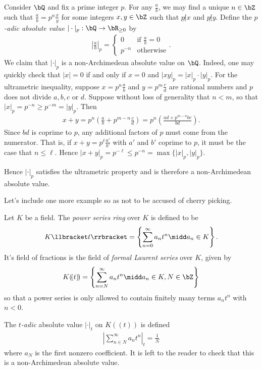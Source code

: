 \begin{example}\label{example}
	Consider $\bQ$ and fix a prime integer $p$. For any $\frac{a}{b}$, we may find a unique $n \in \bZ$ such that $\frac{a}{b} = p^n\frac{x}{y}$ for some integers $x,y\in \bZ$ such that $p \not| x$ and $p \not| y$. Define the \emph{$p$-adic absolute value} $|\cdot|_p:\bQ\to \bR_{\geq 0}$ by
	\begin{align*}
		\left|\frac{a}{b}\right|_p = 
		\begin{cases}
			0 & \text{if } \frac{a}{b} = 0 \\
			p^{-n} & \text{otherwise}
		\end{cases}.
	\end{align*}
	We claim that $|\cdot|_p$ is a non-Archimedean absolute value on $\bQ$. Indeed, one may quickly check that $|x| = 0$ if and only if $x = 0$ and $|xy|_p = |x|_p\cdot|y|_p$. For the ultrametric inequality, suppose $x = p^n\frac{a}{b}$ and $y = p^m\frac{c}{d}$ are rational numbers and $p$ does not divide $a,b,c$ or $d$. Suppose without loss of generality that $n < m$, so that $|x|_p = p^{-n} \geq p^{-m} = |y|_p$. Then
    \begin{align*}
    	x + y = p^n\left(\frac{a}{b} + p^{m - n}\frac{c}{d}\right) = p^n \left(\frac{ad + p^{m-n}bc}{bd}\right).
    \end{align*}
	Since $bd$ is coprime to $p$, any additional factors of $p$ must come from the numerator. That is, if $x + y = p^\ell \frac{a'}{b'}$ with $a'$ and $b'$ coprime to $p$, it must be the case that $n \leq \ell$. Hence $|x + y|_p = p^{-\ell} \leq p^{-n} = \max\{|x|_p,|y|_p\}$.

	Hence $|\cdot|_p$ satisfies the ultrametric property and is therefore a non-Archimedean absolute value.
\end{example}
Let's include one more example so as not to be accused of cherry picking.
\begin{example}\label{example:formal-Laurent-series}
	Let $K$ be a field. The \emph{power series ring} over $K$ is defined to be
	\begin{align*}
		K\llbracket t \rrbracket = \left\{\sum_{n = 0}^\infty a_nt^n \midd a_n \in K\right\}.
	\end{align*}
	It's field of fractions is the field of \emph{formal Laurent series} over $K$, given by
	\begin{align*}
		K(\!( t )\!) = \left\{\sum_{n = N}^\infty a_n t^n \midd a_n \in K, N\in \bZ\right\}
	\end{align*}
	so that a power series is only allowed to contain finitely many terms $a_nt^n$ with $n < 0$. 

	The \emph{$t$-adic} absolute value $|\cdot|_t$ on $K(\!(t)\!)$ is defined
	\begin{align*}
		\left|\sum_{n\in N}^\infty a_nt^n\right|_t = \frac{1}{N}
	\end{align*}
	where $a_N$ is the first nonzero coefficient. It is left to the reader to check that this is a non-Archimedean absolute value.
\end{example}

